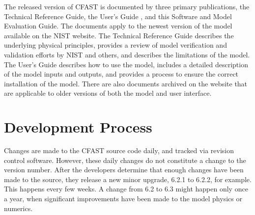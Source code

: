 The released version of CFAST is documented by three primary publications, the Technical Reference Guide\cite{CFAST_Tech_Guide_6}, the User's Guide \cite{CFAST_Users_Guide_6}, and this Software and Model Evaluation Guide. The documents apply to the newest version of the model available on the NIST website. The Technical Reference Guide describes the underlying physical principles, provides a review of model verification and validation efforts by NIST and others, and describes the limitations of the model.  The User's Guide describes how to use the model, includes a detailed description of the model inputs and outputs, and provides a process to ensure the correct installation of the model. There are also documents archived on the website that are applicable to older versions of both the model and user interface.

\section{Development Process}

Changes are made to the CFAST source code daily, and tracked via revision control software. However, these daily changes do not constitute a change to the version number. After the developers determine that enough changes have been made to the source, they release a new minor upgrade, 6.2.1 to 6.2.2, for example. This happens every few weeks. A change from 6.2 to 6.3 might happen only once a year, when significant improvements have been made to the model physics or numerics.


